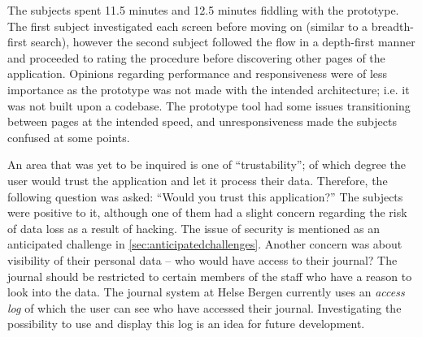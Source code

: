 The subjects spent 11.5 minutes and 12.5 minutes fiddling with the prototype. The first subject investigated each screen before moving on (similar to a breadth-first search), however the second subject followed the flow in a depth-first manner and proceeded to rating the procedure before discovering other pages of the application. Opinions regarding performance and responsiveness were of less importance as the prototype was not made with the intended architecture; i.e. it was not built upon a codebase. The prototype tool had some issues transitioning between pages at the intended speed, and unresponsiveness made the subjects confused at some points.

An area that was yet to be inquired is one of \enquote{trustability}; of which degree the user would trust the application and let it process their data. Therefore, the following question was asked: \enquote{Would you trust this application?} The subjects were positive to it, although one of them had a slight concern regarding the risk of data loss as a result of hacking. The issue of security is mentioned as an anticipated challenge in \autoref{sec:anticipatedchallenges}. Another concern was about visibility of their personal data -- who would have access to their journal? The journal should be restricted to certain members of the staff who have a reason to look into the data. The journal system at Helse Bergen currently uses an \emph{access log} of which the user can see who have accessed their journal. Investigating the possibility to use and display this log is an idea for future development.
